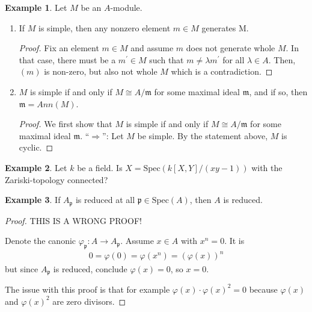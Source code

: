 \documentclass[a4paper]{book}
\theoremstyle{definition}
\newtheorem{example}{Example}[definition]
\begin{document}
\begin{example}
    Let \(M\) be an \(A\)-module.
    \begin{enumerate}
        \item If \(M\) is simple, then any nonzero element \(m \in M\) generates M.
        \begin{proof}
            Fix an element \(m \in M\) and assume \(m\) does not generate whole \(M\). In that case, there must be a \(m^\prime \in M\) such that \(m \neq \lambda m^\prime\) for all \(\lambda \in A\). Then, \((m)\) is non-zero, but also not whole \(M\) which is a contradiction.
        \end{proof}
        \item \(M\) is simple if and only if \(M \cong A / \mathfrak{m}\) for some maximal ideal \(\mathfrak{m}\), and if so, then \(\mathfrak{m} = Ann(M)\).
        \begin{proof}
            We first show that \(M\) is simple if and only if \(M \cong A/\mathfrak{m}\) for some maximal ideal \(\mathfrak{m}\).
            ``\(\Rightarrow\)'': Let \(M\) be simple. By the statement above, \(M\) is cyclic.
        \end{proof}
       \end{enumerate}
\end{example}


\begin{example}
    Let \(k\) be a field. Is \(X = \mathrm{Spec}(k[X, Y] / (xy - 1))\) with the Zariski-topology connected?
\end{example}


\begin{example}
    If \(A_\mathfrak{p}\) is reduced at all \(\mathfrak{p} \in \mathrm{Spec}(A)\), then \(A\) is reduced.
\end{example}
\begin{proof}
    THIS IS A WRONG PROOF!

    Denote the canonic \(\varphi_\mathfrak{p}: A \rightarrow A_\mathfrak{p}\). Assume \(x \in A\) with \(x^n = 0\). It is
    \begin{align*}
        0 = \varphi(0) = \varphi(x^n) = (\varphi(x))^n
    \end{align*}
    but since \(A_\mathfrak{p}\) is reduced, conclude \(\varphi(x) = 0\), so \(x = 0\).

    The issue with this proof is that for example \(\varphi(x) \cdot \varphi(x)^2 = 0\) because \(\varphi(x)\) and \(\varphi(x)^2\) are zero divisors.
\end{proof}
\end{document}
